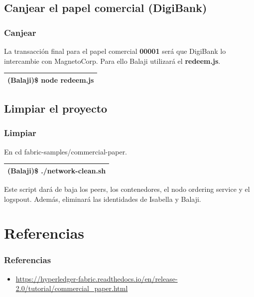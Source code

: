 \documentclass{beamer}
\begin{document}
	\subsection{Canjear el papel comercial (DigiBank)}
	
	\begin{frame}
		\frametitle{Canjear}
		La transacción final para el papel comercial \textbf{00001} será que DigiBank lo intercambie con MagnetoCorp. Para ello Balaji utilizará el \textbf{redeem.js}.\\
		\begin{center}
			\begin{tabulary}{\linewidth}{L}
				\hline
				(Balaji)\$ node redeem.js \\
				\hline
			\end{tabulary} 
		\end{center}
	\end{frame}
	
	\subsection{Limpiar el proyecto}
	
	\begin{frame}
		\frametitle{Limpiar}
		En cd fabric-samples/commercial-paper.\\
		\begin{center}
			\begin{tabulary}{\linewidth}{L}
				\hline
				(Balaji)\$ ./network-clean.sh \\
				\hline
			\end{tabulary} 
		\end{center}
		Este script dará de baja los peers, los contenedores, el nodo ordering service y el logspout. Además, eliminará las identidades de Isabella y Balaji.
	\end{frame}
	
	\section{Referencias}
	
	\begin{frame} [allowframebreaks]
		\frametitle{Referencias}
		\begin{itemize}
			\item \url{https://hyperledger-fabric.readthedocs.io/en/release-2.0/tutorial/commercial\_paper.html}
		\end{itemize}
	\end{frame}
\end{document}
